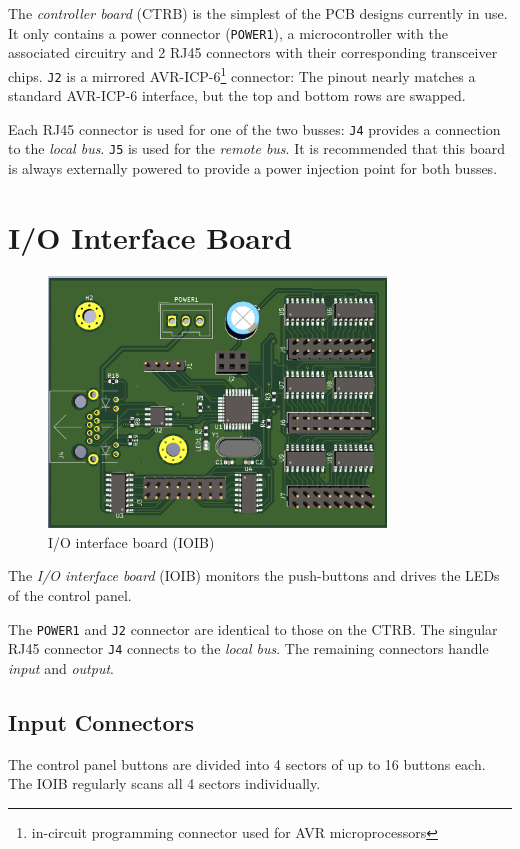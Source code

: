 \documentclass{scrreprt}
\begin{document}
The \emph{controller board} (CTRB) is the simplest of the PCB designs currently in use.
It only contains a power connector (\texttt{POWER1}), a microcontroller with the associated circuitry and 2 RJ45 connectors with their corresponding transceiver chips.
\texttt{J2} is a mirrored AVR-ICP-6\footnote{in-circuit programming connector used for AVR microprocessors} connector:
The pinout nearly matches a standard AVR-ICP-6 interface, but the top and bottom rows are swapped.

Each RJ45 connector is used for one of the two busses:
\texttt{J4} provides a connection to the \emph{local bus}.
\texttt{J5} is used for the \emph{remote bus}.
It is recommended that this board is always externally powered to provide a power injection point for both busses.

\section{I/O Interface Board}
\begin{figure}[h!]
    \centering
    \includegraphics[width=0.8\textwidth]{interface}
    \caption{I/O interface board (IOIB)}
\end{figure}

The \emph{I/O interface board} (IOIB) monitors the push-buttons and drives the LEDs of the control panel.

The \texttt{POWER1} and \texttt{J2} connector are identical to those on the CTRB.
The singular RJ45 connector \texttt{J4} connects to the \emph{local bus}.
The remaining connectors handle \emph{input} and \emph{output}.

\subsection{Input Connectors}
The control panel buttons are divided into 4 sectors of up to 16 buttons each.
The IOIB regularly scans all 4 sectors individually.
\end{document}
